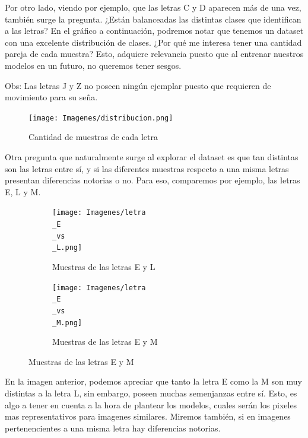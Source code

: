 \documentclass[10pt,a4paper]{article}
\begin{document}
Por otro lado, viendo por ejemplo, que las letras C y D aparecen más de una vez, también surge la pregunta. ¿Están balanceadas las distintas clases que identifican a las letras? En el gráfico a continuación, podremos notar que tenemos un dataset con una excelente distribución de clases. ¿Por qué me interesa
tener una cantidad pareja de cada muestra? Esto, adquiere relevancia puesto que al entrenar nuestros modelos en un futuro, no queremos tener sesgos.
\vspace{0.05cm}
  
Obs: Las letras J y Z no poseen ningún ejemplar puesto que requieren de movimiento para su seña.

\vspace{0.1cm}

\begin{figure}[h]
  \centering
  \texttt{[image: Imagenes/distribucion.png]}
  \caption{Cantidad de muestras de cada letra}
  \label{fig:Tabla 2}
\end{figure}

\newpage

Otra pregunta que naturalmente surge al explorar el dataset es que tan distintas son las letras entre sí, y si las diferentes muestras respecto a una misma letras
presentan diferencias notorias o no. Para eso, comparemos por ejemplo, las letras E, L y M.

\begin{figure}[ht!]
	\begin{subfigure}{0.5\textwidth}
		\texttt{[image: Imagenes/letra\\\_E\\\_vs\\\_L.png]} 
		\caption{Muestras de las letras E y L}
		\label{fig:subfig1}
	\end{subfigure}
	\begin{subfigure}{0.5\textwidth}
		\texttt{[image: Imagenes/letra\\\_E\\\_vs\\\_M.png]}
		\caption{Muestras de las letras E y M}
		\label{fig:subfig2}
	\end{subfigure}
	\label{fig:subfigs}
\end{figure}

En la imagen anterior, podemos apreciar que tanto la letra E como la M son muy distintas a la letra L, sin embargo, poseen muchas semenjanzas entre sí. Esto, es algo a tener en cuenta a la hora de plantear los modelos, cuales serán los pixeles mas representativos para imagenes similares.
Miremos también, si en imagenes pertenencientes a una misma letra hay diferencias notorias. 
\end{document}
